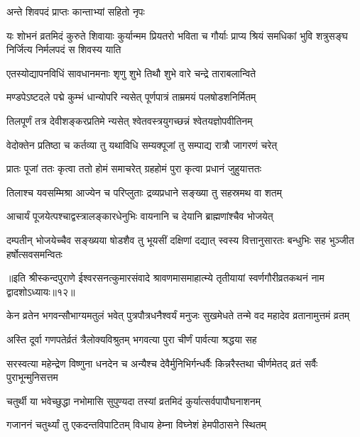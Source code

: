 \onelineshloka
{अन्ते शिवपदं प्राप्तः कान्ताभ्यां सहितो नृपः} %

\twolineshloka
{यः शोभनं व्रतमिदं कुरुते शिवायाः कुर्यान्मम प्रियतरो भविता च गौर्याः}
{प्राप्य श्रियं समधिकां भुवि शत्रुसङ्घ निर्जित्य निर्मलपदं स शिवस्य याति} %

\twolineshloka
{एतस्योद्यापनविधिं सावधानमनाः शृणु}
{शुभे तिथौ शुभे वारे चन्द्रे ताराबलान्विते} %

\twolineshloka
{मण्डपेऽष्टदले पद्मे कुम्भं धान्योपरि न्यसेत्}
{पूर्णपात्रं ताम्रमयं पलषोडशनिर्मितम्} %

\twolineshloka
{तिलपूर्णं तत्र देवीशङ्करप्रतिमे न्यसेत्}
{श्वेतवस्त्रयुगच्छन्नं श्वेतयज्ञोपवीतिनम्} %

\twolineshloka
{वेदोक्तेन प्रतिष्ठा च कर्तव्या तु यथाविधि}
{सम्यक्पूजां तु सम्पाद्य रात्रौ जागरणं चरेत्} %

\twolineshloka
{प्रातः पूजां ततः कृत्वा ततो होमं समाचरेत्}
{ग्रहहोमं पुरा कृत्वा प्रधानं जुहुयात्ततः} %

\twolineshloka
{तिलाश्च यवसम्मिश्रा आज्येन च परिप्लुताः}
{द्रव्यप्रधाने सङ्ख्या तु सहस्रमथ वा शतम्} %

\twolineshloka
{आचार्यं पूजयेत्पश्चाद्वस्त्रालङ्कारधेनुभिः}
{वायनानि च देयानि ब्राह्मणांश्चैव भोजयेत्} %


\threelineshloka
{दम्पतीन् भोजयेच्चैव सङ्ख्यया षोडशैव तु}
{भूयसीं दक्षिणां दद्यात् स्वस्य वित्तानुसारतः}
{बन्धुभिः सह भुञ्जीत हर्षोत्सवसमन्वितः} %


{॥इति श्रीस्कन्दपुराणे ईश्वरसनत्कुमारसंवादे श्रावणमासमाहात्म्ये तृतीयायां स्वर्णगौरीव्रतकथनं नाम द्वादशोऽध्यायः॥१२॥}






\threelineshloka
{केन व्रतेन भगवन्सौभाग्यमतुलं भवेत्}
{पुत्रपौत्रधनैश्वर्यं मनुजः सुखमेधते}
{तन्मे वद महादेव व्रतानामुत्तमं व्रतम्} %


\twolineshloka
{अस्ति दूर्वा गणपतेर्व्रतं त्रैलोक्यविश्रुतम्}
{भगवत्या पुरा चीर्णं पार्वत्या श्रद्धया सह} %


\threelineshloka
{सरस्वत्या महेन्द्रेण विष्णुना धनदेन च}
{अन्यैश्च देवैर्मुनिभिर्गन्धर्वैः किन्नरैस्तथा}
{चीर्णमेतद् व्रतं सर्वैः पुराभून्मुनिसत्तम} %

\twolineshloka
{चतुर्थी या भवेच्छुद्धा नभोमासि सुपुण्यदा}
{तस्यां व्रतमिदं कुर्यात्सर्वपापौघनाशनम्} %

\twolineshloka
{गजाननं चतुर्थ्यां तु एकदन्तविपाटितम्}
{विधाय हेम्ना विघ्नेशं हेमपीठासने स्थितम्} %

